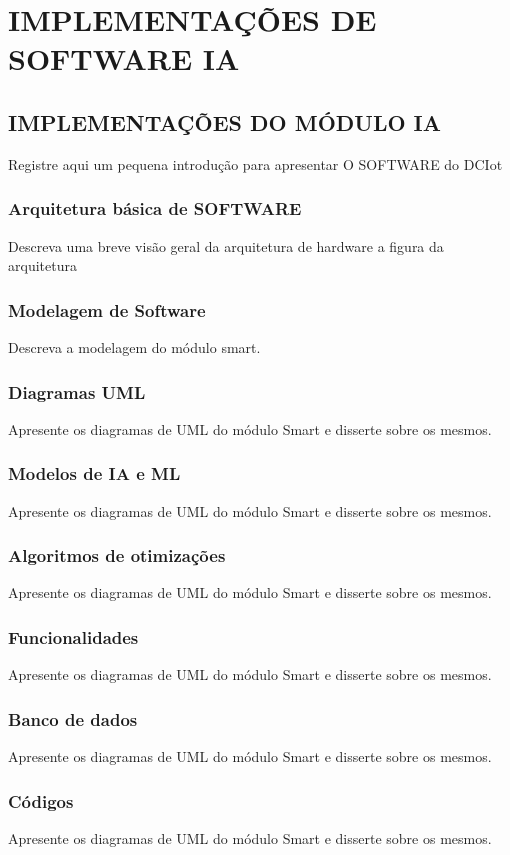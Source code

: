 \chapter{IMPLEMENTAÇÕES DE SOFTWARE IA}


\section{IMPLEMENTAÇÕES DO MÓDULO IA}
Registre aqui um pequena introdução para apresentar O SOFTWARE do DCIot
\subsection{Arquitetura básica de SOFTWARE}
Descreva uma breve visão geral da arquitetura de hardware a figura da arquitetura
\subsection{Modelagem de Software}
Descreva a modelagem do módulo smart.

\subsection{Diagramas UML }
Apresente os diagramas de UML do módulo Smart e disserte sobre os mesmos.


\subsection{Modelos de IA e ML }
Apresente os diagramas de UML do módulo Smart e disserte sobre os mesmos.


\subsection{Algoritmos de otimizações }
Apresente os diagramas de UML do módulo Smart e disserte sobre os mesmos.


\subsection{Funcionalidades}
Apresente os diagramas de UML do módulo Smart e disserte sobre os mesmos.


\subsection{Banco de dados}
Apresente os diagramas de UML do módulo Smart e disserte sobre os mesmos.


\subsection{Códigos}
Apresente os diagramas de UML do módulo Smart e disserte sobre os mesmos.
